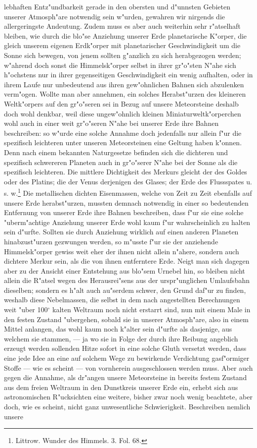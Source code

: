 \documentclass[a4paper, 8pt, oneside, polutonikogreek, german]{article}
\begin{document}
lebhaften Entz"undbarkeit gerade in den obersten und d"unnsten Gebieten unserer Atmosph"are notwendig sein w"urden, gewahren wir nirgends die allergeringste Andeutung. Zudem muss es aber auch weiterhin sehr r"atselhaft bleiben, wie durch die blo"se Anziehung unserer Erde planetarische K"orper, die gleich unserem eigenen Erdk"orper mit planetarischer Geschwindigkeit um die Sonne sich bewegen, von jenem sollten g"anzlich zu sich herabgezogen werden; w"ahrend doch sonst die Himmelsk"orper selbst in ihrer gr"o"sten N"ahe sich h"ochstens nur in ihrer gegenseitigen Geschwindigkeit ein wenig aufhalten, oder in ihrem Laufe nur unbedeutend aus ihren gew"ohnlichen Bahnen sich abzulenken verm"ogen. Wollte man aber annehmen, ein solches Herabst"urzen des kleineren Weltk"orpers auf den gr"o"seren sei in Bezug auf unsere Meteorsteine deshalb doch wohl denkbar, weil diese ungew"ohnlich kleinen Miniaturweltk"orperchen wohl auch in einer weit gr"o"seren N"ahe bei unserer Erde ihre Bahnen beschreiben: so w"urde eine solche Annahme doch jedenfalls nur allein f"ur die spezifisch leichteren unter unseren Meteorsteinen eine Geltung haben k"onnen. Denn nach einem bekannten Naturgesetze befinden sich die dichteren und spezifisch schwereren Planeten auch in gr"o"serer N"ahe bei der Sonne als die spezifisch leichteren. Die mittlere Dichtigkeit des Merkurs gleicht der des Goldes oder des Platins; die der Venus derjenigen des Glases; der Erde des Flussspates u. s. w.\footnote{Littrow. Wunder des Himmels. 3. Fol. 68.} Die metallischen dichten Eisenmassen, welche von Zeit zu Zeit ebenfalls auf unsere Erde herabst"urzen, mussten demnach notwendig in einer so bedeutenden Entfernung von unserer Erde ihre Bahnen beschreiben, dass f"ur sie eine solche "uberm"achtige Anziehung unserer Erde wohl kaum f"ur wahrscheinlich zu halten sein d"urfte. Sollten sie durch Anziehung wirklich auf einen anderen Planeten hinabzust"urzen gezwungen werden, so m"usste f"ur sie der anziehende Himmelsk"orper gewiss weit eher der ihnen nicht allein n"ahere, sondern auch dichtere Merkur sein, als die von ihnen entferntere Erde. Neigt man sich dagegen aber zu der Ansicht einer Entstehung aus blo"sem Urnebel hin, so bleiben nicht allein die R"atsel wegen des Herausrei"sens aus der urspr"unglichen Umlaufsbahn dieselben; sondern es h"alt auch au"serdem schwer, den Grund daf"ur zu finden, weshalb diese Nebelmassen, die selbst in dem nach angestellten Berechnungen weit "uber 100$^\circ$ kalten Weltraum noch nicht erstarrt sind, nun mit einem Male in den festen Zustand "ubergehen, sobald sie in unserer Atmosph"are, also in einem Mittel anlangen, das wohl kaum noch k"alter sein d"urfte als dasjenige, aus welchem sie stammen, --- ja wo sie in Folge der durch ihre Reibung angeblich erzeugt werden sollenden Hitze sofort in eine solche Gluth versetzt werden, dass eine jede Idee an eine auf solchem Wege zu bewirkende Verdichtung gasf"ormiger Stoffe --- wie es scheint --- von vornherein ausgeschlossen werden muss. Aber auch gegen die Annahme, als dr"angen unsere Meteorsteine in bereits festem Zustand aus dem freien Weltraum in den Dunstkreis unserer Erde ein, erhebt sich aus astronomischen R"ucksichten eine weitere, bisher zwar noch wenig beachtete, aber doch, wie es scheint, nicht ganz unwesentliche Schwierigkeit. Beschreiben nemlich unsere 
\end{document}
